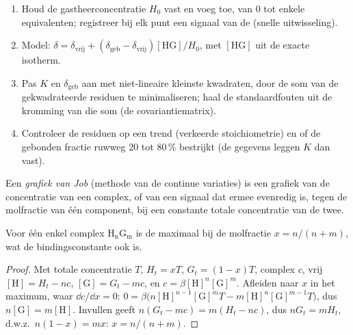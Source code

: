 \begin{method}\label{met:b3:supramolecular:nmr-titration}
\begin{enumerate}
  \item Houd de gastheerconcentratie $H_0$ vast en voeg  toe, van 0 tot enkele
        equivalenten; registreer bij elk punt een signaal van de 
        (snelle uitwisseling).
  \item Model: $\delta = \delta_{\mathrm{vrij}} + (\delta_{\mathrm{geb}} - \delta_{\mathrm{vrij}})[\mathrm{HG}]/H_0$, met $[\mathrm{HG}]$ uit de exacte isotherm.
  \item Pas $K$ en $\delta_{\mathrm{geb}}$ aan met niet-lineaire kleinste kwadraten, door de som van de
        gekwadrateerde residuen te minimaliseren; haal de standaardfouten
        uit de kromming van die som (de covariantiematrix).
  \item Controleer de residuen op een trend (verkeerde stoichiometrie) en
        of de gebonden fractie ruwweg 20 tot 80\,\% bestrijkt (de gegevens leggen $K$ dan vast).
\end{enumerate}
\end{method}

\begin{definition}\label{def:b3:supramolecular:job}
Een \emph{grafiek van Job} (methode van de continue
variaties) is een grafiek van de concentratie van een complex, of van een
signaal dat ermee evenredig is, tegen de molfractie van één component,
bij een constante totale concentratie van de twee.
\end{definition}

\begin{proposition}\label{prop:b3:supramolecular:job}
Voor één enkel complex $\mathrm{H_nG_m}$ is de  maximaal bij de
molfractie 
$x = n/(n + m)$, wat de bindingsconstante ook is.
\end{proposition}

\begin{proof}
Met totale concentratie $T$, $H_t = xT$, $G_t = (1 - x)T$, complex $c$, vrij $[\mathrm H] = H_t - nc$,
$[\mathrm G] = G_t - mc$, en $c = \beta[\mathrm H]^n[\mathrm G]^m$. Afleiden naar $x$ in het maximum, waar
$\dd c/\dd x = 0$: $0 = \beta\bigl(n[\mathrm H]^{n-1}[\mathrm G]^m T - m[\mathrm H]^n[\mathrm G]^{m-1}T\bigr)$, dus $n[\mathrm G] = m[\mathrm H]$. Invullen geeft
$n(G_t - mc) = m(H_t - nc)$, dus $nG_t = mH_t$, d.w.z.\ $n(1 - x) = mx$: $x = n/(n + m)$.
\end{proof}

